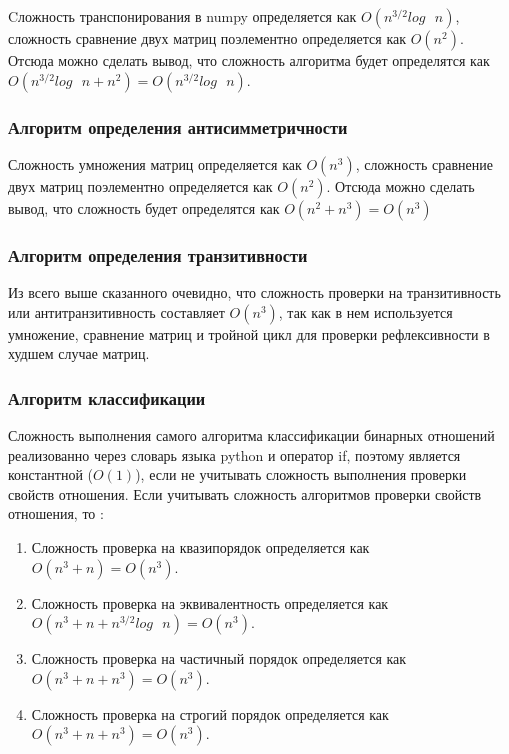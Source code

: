 \documentclass[spec, och, labwork]{shiza}
\begin{document}
            Cложность транспонирования в numpy определяется как $O(n^{3/2}log \text{ } n)$, сложность сравнение двух матриц поэлементно определяется как $O(n^2)$. 
            Отсюда можно сделать вывод, что сложность алгоритма будет определятся как 
            $O(n^{3/2}log \text{ } n + n^2) = O(n^{3/2}log \text{ } n)$.

        \subsubsection{Алгоритм определения антисимметричности}

            Сложность умножения матриц определяется как $O(n^3)$, сложность сравнение двух матриц поэлементно определяется как $O(n^2)$.
            Отсюда можно сделать вывод, что сложность будет определятся как $O(n^2 + n^3) = O(n^3)$

        \subsubsection{Алгоритм определения транзитивности}

            Из всего выше сказанного очевидно, что сложность проверки на транзитивность или антитранзитивность составляет $O(n^3)$,
            так как в нем используется умножение, сравнение матриц и тройной цикл для проверки рефлексивности в худшем случае матриц.

        \subsubsection{Алгоритм классификации}
            Сложность выполнения самого алгоритма классификации бинарных отношений реализованно через словарь языка python
            и оператор if, поэтому является константной ($O(1)$), если не учитывать сложность выполнения проверки свойств отношения.
            Если учитывать сложность алгоритмов проверки свойств отношения, то :

            \begin{enumerate}
                \item Сложность проверка на квазипорядок определяется как $O(n^3 + n) = O(n^3)$.
                \item Сложность проверка на эквивалентность определяется как $O(n^3 + n + n^{3/2}log \text{ } n) = O(n^3)$.
                \item Сложность проверка на частичный порядок определяется как $O(n^3 + n + n^3) = O(n^3)$.
                \item Сложность проверка на строгий порядок определяется как $O(n^3 + n + n^3) = O(n^3)$.
            \end{enumerate}
\end{document}
